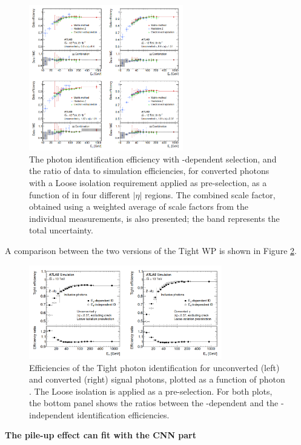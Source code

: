 \begin{figure}[htbp]
    \centering
    \includegraphics[width=0.6\textwidth]{Ch3/Img/Unconverted_Eff_2017.png}
    \caption{The photon identification efficiency with \eT-dependent selection, and the ratio of data to simulation efficiencies, for converted photons with a Loose isolation requirement applied as pre-selection, as a function of \eT in four different $|\eta|$ regions. The combined scale factor, obtained using a weighted average of scale factors from the individual measurements, is also presented; the band represents the total uncertainty.}
    \label{fig:gamma:ID:Eff:Cov}
\end{figure}
A comparison between the two versions of the Tight WP is shown in Figure \ref{fig:gamma:ID:Eff:Tight}.
\begin{figure}[htbp]
    \centering
    \includegraphics[width=0.75\textwidth]{Ch3/Img/Tight_ID.png}
    \caption{Efficiencies of the Tight photon identification for unconverted (left) and converted (right) signal photons, plotted as a function of photon \eT. The Loose isolation  is applied as a pre-selection. For both plots, the bottom panel shows the ratios between the \eT-dependent and the \eT-independent identification efficiencies.}
    \label{fig:gamma:ID:Eff:Tight}
\end{figure}
\textbf{The pile-up effect can fit with the CNN part}
